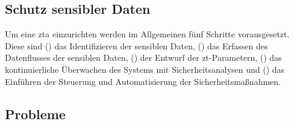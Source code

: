 \subsection{Schutz sensibler Daten}\label{subsec:schutz-sensibler-daten}
Um eine \ac{zta} einzurichten werden im Allgemeinen fünf Schritte vorausgesetzt.
Diese sind () das Identifizieren der sensiblen Daten, () das Erfassen des Datenflusses der sensiblen Daten, () der Entwurf der \ac{zt}-Parametern, () das kontinuierliche Überwachen des Systems mit Sicherheitsanalysen und () das Einführen der Steuerung und Automatisierung der Sicherheitsmaßnahmen.\autocites[\vglf][-3]{ahmed-2020}[\vglf][]{balaouras-2023}

\subsection{Probleme}\label{subsec:probleme}